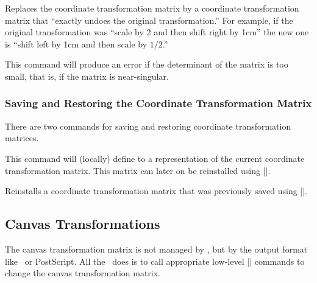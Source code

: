 \begin{command}{\pgftransforminvert}
  Replaces the coordinate transformation matrix by a coordinate
  transformation matrix that ``exactly undoes the original
  transformation.'' For example, if the original transformation was
  ``scale by 2 and then shift right by 1cm'' the new one is ``shift
  left by 1cm and then scale by $1/2$.''

  This command will produce an error if the determinant of
  the matrix is too small, that is, if the matrix is near-singular.
\begin{codeexample}[]
\end{codeexample}
\end{command}

\subsubsection{Saving and Restoring the Coordinate Transformation
  Matrix}

There are two commands for saving and restoring coordinate
transformation matrices.

\begin{command}{\pgfgettransform{}}
  This command will (locally) define  to a representation
  of the current coordinate transformation matrix. This matrix can
  later on be reinstalled using |\pgfsettransform|.
\end{command}


\begin{command}{\pgfsettransform{}}
  Reinstalls a coordinate transformation matrix that was previously
  saved using |\pgfgettransform|.
\end{command}



\subsection{Canvas Transformations}

The canvas transformation matrix is not managed by \pgfname, but by
the output format like \pdf\ or PostScript. All the \pgfname\ does is
to call appropriate low-level |\pgfsys@| commands to change the canvas
transformation matrix.

